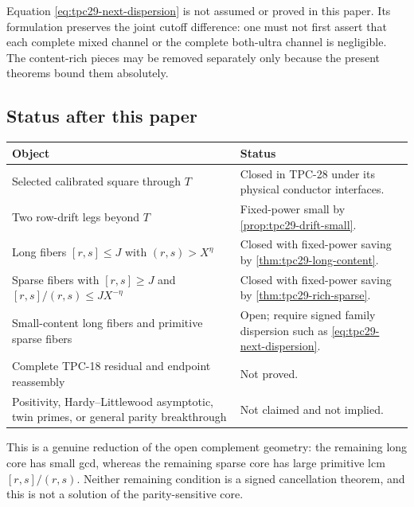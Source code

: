 Equation \eqref{eq:tpc29-next-dispersion} is not assumed or proved in
this paper.  Its formulation preserves the joint cutoff difference:
one must not first assert that each complete mixed channel or the
complete both-ultra channel is negligible.  The content-rich pieces
may be removed separately only because the present theorems bound
them absolutely.

\subsection{Status after this paper}

\begin{center}
\begin{tabular}{>{\raggedright\arraybackslash}p{}
                >{\raggedright\arraybackslash}p{}}
\toprule
Object & Status \\
\midrule
Selected calibrated square through $T$
& Closed in TPC-28 under its physical conductor interfaces. \\
\addlinespace
Two row-drift legs beyond $T$
& Fixed-power small by \cref{prop:tpc29-drift-small}. \\
\addlinespace
Long fibers $[r,s]\le J$ with $(r,s)>X^\eta$
& Closed with fixed-power saving by
  \cref{thm:tpc29-long-content}. \\
\addlinespace
Sparse fibers with $[r,s]\ge J$ and
$[r,s]/(r,s)\le JX^{-\eta}$
& Closed with fixed-power saving by
  \cref{thm:tpc29-rich-sparse}. \\
\addlinespace
Small-content long fibers and primitive sparse fibers
& Open; require signed family dispersion such as
  \eqref{eq:tpc29-next-dispersion}. \\
\addlinespace
Complete TPC-18 residual and endpoint reassembly
& Not proved. \\
\addlinespace
Positivity, Hardy--Littlewood asymptotic, twin primes, or general
parity breakthrough
& Not claimed and not implied. \\
\bottomrule
\end{tabular}
\end{center}

This is a genuine reduction of the open complement geometry: the
remaining long core has small gcd, whereas the remaining sparse core
has large primitive lcm $[r,s]/(r,s)$.  Neither remaining condition is
a signed cancellation theorem, and this is not a solution of the
parity-sensitive core.
